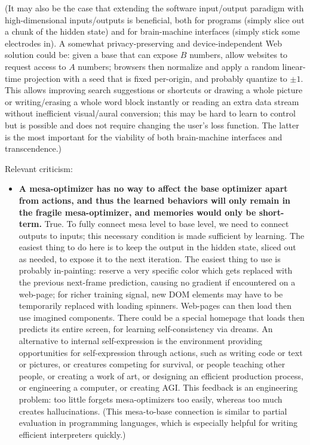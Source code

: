 \documentclass{article}
\begin{document}
\begin{itemize}
(It may also be the case that extending the software input/output paradigm with high-dimensional inputs/outputs is beneficial, both for programs (simply slice out a chunk of the hidden state) and for brain-machine interfaces (simply stick some electrodes in). A somewhat privacy-preserving and device-independent Web solution could be: given a base that can expose $B$ numbers, allow websites to request access to $A$ numbers; browsers then normalize and apply a random linear-time projection with a seed that is fixed per-origin, and probably quantize to $\pm1$. This allows improving search suggestions or shortcuts or drawing a whole picture or writing/erasing a whole word block instantly or reading an extra data stream without inefficient visual/aural conversion; this may be hard to learn to control but is possible and does not require changing the user's loss function. The latter is the most important for the viability of both brain-machine interfaces and transcendence.)
\end{itemize}

Relevant criticism:

\begin{itemize}
\item \textbf{A mesa-optimizer has no way to affect the base optimizer apart from actions, and thus the learned behaviors will only remain in the fragile mesa-optimizer, and memories would only be short-term.} True. To fully connect mesa level to base level, we need to connect outputs to inputs; this necessary condition is made sufficient by learning. The easiest thing to do here is to keep the output in the hidden state, sliced out as needed, to expose it to the next iteration. The easiest thing to use is probably in-painting: reserve a very specific color which gets replaced with the previous next-frame prediction, causing no gradient if encountered on a web-page; for richer training signal, new DOM elements may have to be temporarily replaced with loading spinners. Web-pages can then load then use imagined components. There could be a special homepage that loads then predicts its entire screen, for learning self-consistency via dreams. An alternative to internal self-expression is the environment providing opportunities for self-expression through actions, such as writing code or text or pictures, or creatures competing for survival, or people teaching other people, or creating a work of art, or designing an efficient production process, or engineering a computer, or creating AGI. This feedback is an engineering problem: too little forgets mesa-optimizers too easily, whereas too much creates hallucinations. (This mesa-to-base connection is similar to partial evaluation in programming languages, which is especially helpful for writing efficient interpreters quickly.)
\end{itemize}
\end{document}
